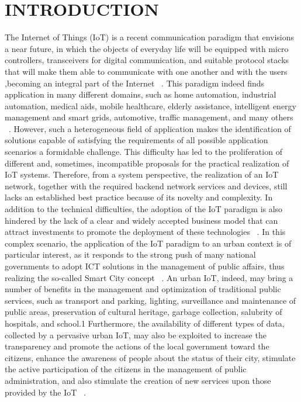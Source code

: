 \documentclass[conference]{IEEEtran}
\begin{document}
	\section{INTRODUCTION}
	The Internet of Things (IoT) is a recent communication paradigm that envisions a near future, in which the objects of everyday life will be equipped with micro controllers, transceivers for digital communication,
	and suitable protocol stacks that will make them able to communicate with one another and with the users ,becoming an integral part of the Internet ~\autocite{r1}. This paradigm indeed finds application in many different domains, such as home automation, industrial automation, medical aids, mobile healthcare, elderly assistance, intelligent
	energy management and smart grids, automotive, traffic management, and many others ~\autocite{r2}. However, such a
	heterogeneous field of application makes the identification of solutions capable of satisfying the requirements of all possible application scenarios a formidable challenge. This difficulty has led to the proliferation of different and, sometimes, incompatible proposals for the practical realization of IoT systems. Therefore, from a system perspective, the realization of an IoT network, together with the required backend network services and devices, still lacks an established best practice because of its novelty and complexity. In addition to the technical difficulties, the adoption of the IoT paradigm is also hindered by the lack of a clear and widely accepted business model that can attract investments to promote the deployment of these technologies ~\autocite{r3}. In this complex scenario, the application of the IoT paradigm to an urban context is of particular interest, as it responds to the strong push of many national governments to adopt ICT solutions in the management of public affairs, thus realizing the so-called Smart City concept ~\autocite{r4}. An urban IoT, indeed, may bring a number of benefits in the management and optimization of traditional public services, such as transport and parking, lighting, surveillance and maintenance of public areas, preservation of cultural heritage, garbage collection, salubrity of hospitals, and school.1 Furthermore, the availability of different types of data, collected by a pervasive urban IoT, may also be exploited to increase the transparency and promote the actions of the local government toward the citizens, enhance the awareness of people about the status of their city, stimulate the active participation of the citizens in the management of public administration, and also stimulate the creation of new services
	upon those provided by the IoT ~\autocite{r5}.
	
\end{document}
